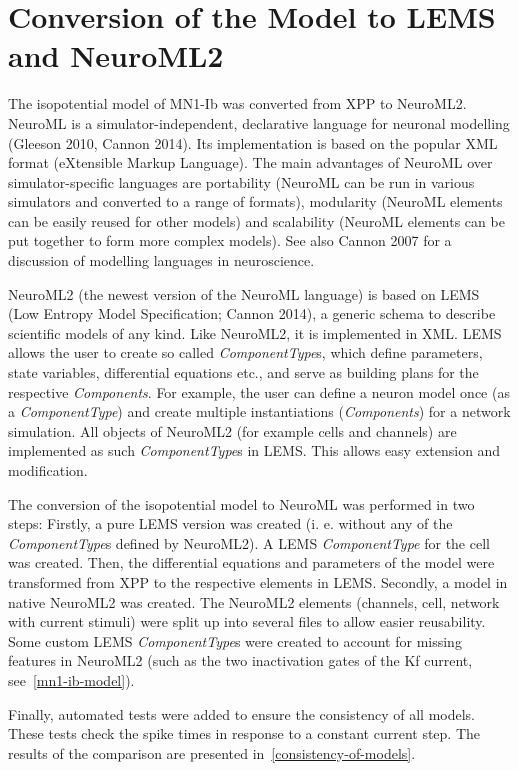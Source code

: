 \documentclass[12pt,a4paper,]{report}
\begin{document}
\section{Conversion of the Model to LEMS and NeuroML2}\label{conversion}

The isopotential model of MN1-Ib was converted from XPP to NeuroML2.
NeuroML is a simulator-independent, declarative language for neuronal
modelling (Gleeson 2010, Cannon 2014). Its implementation is based on
the popular XML format (eXtensible Markup Language). The main advantages
of NeuroML over simulator-specific languages are portability (NeuroML
can be run in various simulators and converted to a range of formats),
modularity (NeuroML elements can be easily reused for other models) and
scalability (NeuroML elements can be put together to form more complex
models). See also Cannon 2007 for a discussion of modelling languages in
neuroscience.

NeuroML2 (the newest version of the NeuroML language) is based on LEMS
(Low Entropy Model Specification; Cannon 2014), a generic schema to
describe scientific models of any kind. Like NeuroML2, it is implemented
in XML. LEMS allows the user to create so called \emph{ComponentType}s,
which define parameters, state variables, differential equations etc.,
and serve as building plans for the respective \emph{Components}. For
example, the user can define a neuron model once (as a
\emph{ComponentType}) and create multiple instantiations
(\emph{Components}) for a network simulation. All objects of NeuroML2
(for example cells and channels) are implemented as such
\emph{ComponentType}s in LEMS. This allows easy extension and
modification.

The conversion of the isopotential model to NeuroML was performed in two
steps: Firstly, a pure LEMS version was created (i. e. without any of
the \emph{ComponentType}s defined by NeuroML2). A LEMS
\emph{ComponentType} for the cell was created. Then, the differential
equations and parameters of the model were transformed from XPP to the
respective elements in LEMS. Secondly, a model in native NeuroML2 was
created. The NeuroML2 elements (channels, cell, network with current
stimuli) were split up into several files to allow easier reusability.
Some custom LEMS \emph{ComponentType}s were created to account for
missing features in NeuroML2 (such as the two inactivation gates of the
Kf current, see~\ref{mn1-ib-model}).

Finally, automated tests were added to ensure the consistency of all
models. These tests check the spike times in response to a constant
current step. The results of the comparison are presented
in~\ref{consistency-of-models}.
\end{document}
